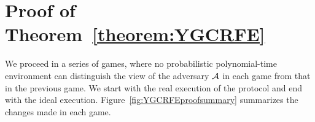 
\section{Proof of Theorem~\ref{theorem:YGCRFE}}
\label{sec:rfeproof}
We proceed in a series of games, where no probabilistic polynomial-time environment can distinguish the view of the adversary $\mathcal{A}$ in each game from that in the previous game.
We start with the real execution of the protocol and end with the ideal execution. 
Figure~\ref{fig:YGCRFEproofsummary} summarizes the changes made in each game.

\newcommand{\gamereal}[1]{{\color{red}#1}}
\newcommand{\gameintermediate}[1]{{\color{orange}#1}}
\newcommand{\gameideal}[1]{{\color{blue}#1}}

